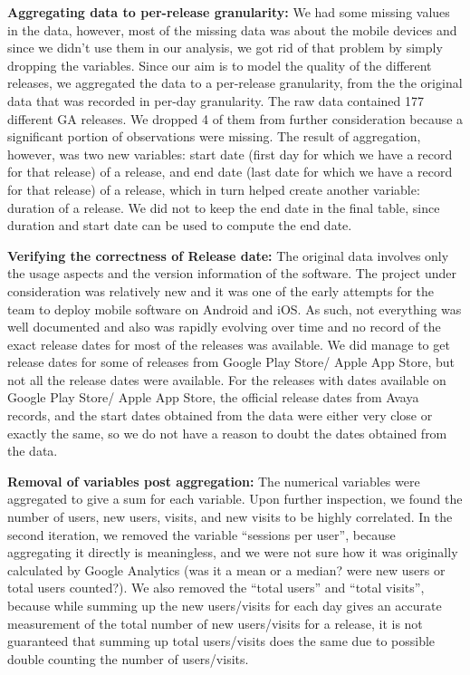 \documentclass[smallextended]{svjour3}       %
\begin{document}
\noindent
\textbf{Aggregating data to per-release granularity:}
We had some missing values in the data, however, most of the missing data was about the
mobile devices and since we didn't use them in our analysis, we got rid of that
problem by simply dropping the variables. Since our aim is to model the quality of the
different releases, we aggregated the data to a per-release 
granularity, from the the original data that was recorded in per-day granularity. 
The raw data contained 177 different GA releases. We dropped 4 of
them from further consideration because a significant
portion of observations were missing. The result of aggregation, however,
was two new variables: start date (first day for which we have a
record for that release) of a release, and end date (last date for
which we have a record for that release) of a release, which in turn
helped create another variable: duration of a release. We did
not to keep the end date in the final table, since duration and
start date can be used to compute the end date.

\noindent
\textbf{Verifying the correctness of Release date:}
The original data involves only the usage aspects and the version
information of the software. The project under consideration was
relatively new and it was one of the early attempts for the team to deploy
mobile software on Android and iOS. As such, not everything
was well documented and also was rapidly evolving over time  and no
record of the exact release dates for most of the releases was
available. We did manage to get release dates for some of releases
from Google Play Store/ Apple App Store, but not all the release dates  were
available.  For the releases with dates available on Google Play
Store/ Apple App Store, the official release dates from Avaya records, and the start
dates obtained from the data were either very close or exactly the
same, so we do not have a reason to doubt the dates obtained from the
data. 

\noindent
\textbf{Removal  of variables post aggregation:}
The numerical variables were aggregated to give a sum for each
variable. Upon further inspection, we found the number of users, new
users, visits, and new visits to be highly correlated. In the second
iteration, we removed the variable ``sessions per user'', because
aggregating it directly is meaningless, and we were not sure how it
was originally calculated by Google Analytics (was it a mean or
a median? were new users or total users counted?). We also removed
the ``total users'' and ``total visits'', because while summing up the
new users/visits for each day gives an accurate measurement of the total
number of new users/visits for a release, it is not guaranteed that
summing up total users/visits does the same due to possible double
counting the number of users/visits. 
\end{document}
